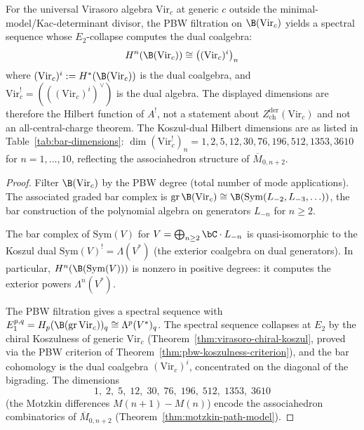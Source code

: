 \begin{proposition}
\label{prop:virasoro-koszul-acyclic}
For the universal Virasoro algebra $\mathrm{Vir}_c$ at generic
$c$ outside the minimal-model/Kac-determinant divisor, the PBW
filtration on $\B(\mathrm{Vir}_c)$ yields a spectral sequence whose
$E_2$-collapse computes the dual coalgebra:
\begin{equation}\label{eq:virasoro-koszul-acyclic}
H^n(\B(\mathrm{Vir}_c)) \cong \bigl((\mathrm{Vir}_c)^i\bigr)_n
\end{equation}
where $(\mathrm{Vir}_c)^i := H^*(\B(\mathrm{Vir}_c))$ is the dual
coalgebra, and $\mathrm{Vir}_c^! = (((\mathrm{Vir}_c)^i)^\vee)$ is the
dual algebra. The displayed dimensions are therefore the Hilbert
function of $A^!$, not a statement about
$Z^{\mathrm{der}}_{\mathrm{ch}}(\mathrm{Vir}_c)$ and not an
all-central-charge theorem.
The Koszul-dual Hilbert dimensions are as listed in
Table~\textup{\ref{tab:bar-dimensions}}:
$\dim(\mathrm{Vir}_c^!)_n =
1, 2, 5, 12, 30, 76, 196, 512, 1353, 3610$ for
$n = 1, \ldots, 10$,
reflecting the associahedron structure of
$\overline{M}_{0,n+2}$.
\end{proposition}

\begin{proof}
Filter $\B(\mathrm{Vir}_c)$ by the PBW degree (total number
of mode applications). The associated graded bar complex is
$\mathrm{gr}\,\B(\mathrm{Vir}_c)
\cong \B(\mathrm{Sym}(L_{-2}, L_{-3}, \ldots))$,
the bar construction of the polynomial algebra on generators
$L_{-n}$ for $n \geq 2$.

The bar complex of $\mathrm{Sym}(V)$ for $V = \bigoplus_{n \geq 2}
\bC \cdot L_{-n}$ is quasi-isomorphic to the Koszul dual
$\mathrm{Sym}(V)^! = \Lambda(V^*)$ (the exterior coalgebra on dual
generators). In particular, $H^n(\B(\mathrm{Sym}(V)))$ is nonzero
in positive degrees: it computes the exterior powers $\Lambda^n(V^*)$.

The PBW filtration gives a spectral sequence with
$E_1^{p,q} = H_p(\B(\mathrm{gr}\,\mathrm{Vir}_c))_q
\cong \Lambda^p(V^*)_q$.
The spectral sequence collapses at $E_2$ by the chiral
Koszulness of generic $\mathrm{Vir}_c$
(Theorem~\ref{thm:virasoro-chiral-koszul}, proved via
the PBW criterion of Theorem~\ref{thm:pbw-koszulness-criterion}),
and the bar cohomology is the dual coalgebra
$(\mathrm{Vir}_c)^i$, concentrated on the diagonal of the bigrading.
The dimensions
\[
1,\; 2,\; 5,\; 12,\; 30,\; 76,\; 196,\; 512,\; 1353,\; 3610
\]
(the Motzkin differences $M(n{+}1) - M(n)$) encode the associahedron
combinatorics of $\overline{M}_{0,n+2}$
(Theorem~\ref{thm:motzkin-path-model}).
\end{proof}


